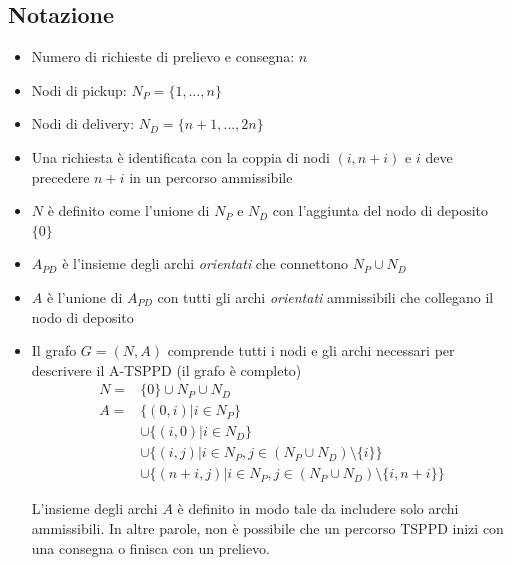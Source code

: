 \documentclass[9pt]{beamer}
\begin{document}
\subsection{Notazione}
\begin{frame}[allowframebreaks]{\subsecname}
	\begin{itemize}
		\item
		Numero di richieste di prelievo e consegna: $n$
		
		\item
		Nodi di pickup: $N_P = \{1, \dots, n\}$
		
		\item
		Nodi di delivery: $N_D = \{n+1, \dots, 2n\}$
		
		\item
		Una richiesta è identificata con la coppia di nodi $(i,n+i)$ e $i$ deve precedere $n+i$ in un percorso ammissibile
		
		\item
		$N$ è definito come l'unione di $N_P$ e $N_D$ con l'aggiunta del nodo di deposito $\{0\}$
		
		\item
		$A_{PD}$ è l'insieme degli archi \emph{orientati} che connettono $N_P \cup N_D$
	
		\item
		$A$ è l'unione di $A_{PD}$ con tutti gli archi \emph{orientati} ammissibili che collegano il nodo di deposito
		
		\item
		Il grafo $G=(N,A)$ comprende tutti i nodi e gli archi necessari per descrivere il A-TSPPD (il grafo è completo)
		\begin{equation*}
			\begin{aligned}
			N= & \{0\} \cup N_P \cup N_D \\
			A = & \{ (0,i) | i \in N_P \} \\
			& \cup \{ (i,0) | i \in N_D \} \\
			& \cup \{ (i,j) | i \in N_P , j \in ( N_P \cup N_D ) \setminus \{ i \} \} \\
			& \cup \{ ( n + i, j) | i \in N_P , j \in (N_P \cup N_D ) \setminus \{ i , n + i \} \}
			\end{aligned}
		\end{equation*}
		
		L'insieme degli archi $A$ è definito in modo tale da includere solo archi ammissibili.
		In altre parole, non è possibile che un percorso TSPPD inizi con una consegna o finisca con un prelievo.


\end{itemize}
\end{frame}
\end{document}
